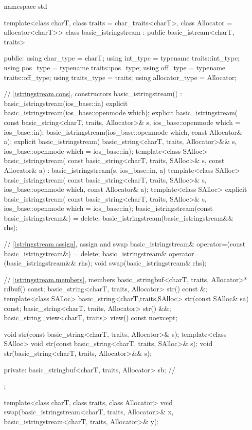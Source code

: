 %
\begin{codeblock}
namespace std {
  template<class charT, class traits = char_traits<charT>,
           class Allocator = allocator<charT>>
  class basic_istringstream : public basic_istream<charT, traits> {
  public:
    using char_type      = charT;
    using int_type       = typename traits::int_type;
    using pos_type       = typename traits::pos_type;
    using off_type       = typename traits::off_type;
    using traits_type    = traits;
    using allocator_type = Allocator;

    // \ref{istringstream.cons}, constructors
    basic_istringstream() : basic_istringstream(ios_base::in) {}
    explicit basic_istringstream(ios_base::openmode which);
    explicit basic_istringstream(
      const basic_string<charT, traits, Allocator>& s,
      ios_base::openmode which = ios_base::in);
    basic_istringstream(ios_base::openmode which, const Allocator& a);
    explicit basic_istringstream(
      basic_string<charT, traits, Allocator>&& s,
      ios_base::openmode which = ios_base::in);
    template<class SAlloc>
      basic_istringstream(
        const basic_string<charT, traits, SAlloc>& s, const Allocator& a)
        : basic_istringstream(s, ios_base::in, a) {}
    template<class SAlloc>
      basic_istringstream(
        const basic_string<charT, traits, SAlloc>& s,
        ios_base::openmode which, const Allocator& a);
    template<class SAlloc>
      explicit basic_istringstream(
        const basic_string<charT, traits, SAlloc>& s,
        ios_base::openmode which = ios_base::in);
    basic_istringstream(const basic_istringstream&) = delete;
    basic_istringstream(basic_istringstream&& rhs);

    // \ref{istringstream.assign}, assign and swap
    basic_istringstream& operator=(const basic_istringstream&) = delete;
    basic_istringstream& operator=(basic_istringstream&& rhs);
    void swap(basic_istringstream& rhs);

    // \ref{istringstream.members}, members
    basic_stringbuf<charT, traits, Allocator>* rdbuf() const;
    basic_string<charT, traits, Allocator> str() const &;
    template<class SAlloc>
      basic_string<charT,traits,SAlloc> str(const SAlloc& sa) const;
    basic_string<charT, traits, Allocator> str() &&;
    basic_string_view<charT, traits> view() const noexcept;

    void str(const basic_string<charT, traits, Allocator>& s);
    template<class SAlloc>
      void str(const basic_string<charT, traits, SAlloc>& s);
    void str(basic_string<charT, traits, Allocator>&& s);

  private:
    basic_stringbuf<charT, traits, Allocator> sb;   // \expos
  };

  template<class charT, class traits, class Allocator>
    void swap(basic_istringstream<charT, traits, Allocator>& x,
              basic_istringstream<charT, traits, Allocator>& y);
}
\end{codeblock}

